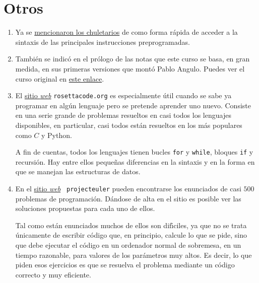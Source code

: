 \section{Otros}
 \begin{enumerate}
  \item Ya se \hyperref[chuletas]{mencionaron los chuletarios} de {\sage} como
forma r\'apida de acceder a la sintaxis de las principales instrucciones
preprogramadas. 
\item Tambi\'en se indic\'o en el pr\'ologo de las notas que este curso se basa,
en gran medida, en sus primeras versiones que mont\'o Pablo Angulo. Puedes ver 
el curso original en 
  \href{http://verso.mat.uam.es/~pablo.angulo/doc/laboratorio/index.html}{este
enlace}. 


  
  
  \item El \href{http://rosettacode.org/wiki/Rosetta_Code}{sitio {\itshape web}}
{\tt rosettacode.org} es especialmente \'util cuando se sabe ya programar en
alg\'un lenguaje pero se pretende aprender uno nuevo. Consiste en una serie
grande de problemas resueltos en casi todos los lenguajes disponibles,  en
particular, casi todos est\'an resueltos en los m\'as populares como $C$ y
Python.

A fin de cuentas, todos los lenguajes tienen bucles \lstinline|for| y
\lstinline|while|, bloques \lstinline|if| y recursi\'on. Hay entre ellos
peque\~nas diferencias en la sintaxis y en la forma en que se manejan las
estructuras de datos. 
  
  \item En el \href{http://projecteuler.net/}{sitio {\itshape web}} {\tt
projecteuler} pueden encontrarse los enunciados de casi $500$ problemas de
programaci\'on. D\'andose de alta en el sitio es posible ver las soluciones
propuestas para cada uno de ellos.  

Tal como est\'an enunciados muchos de ellos son dif\'{\i}ciles, ya que no se
trata \'unicamente de escribir c\'odigo que, en principio, calcule lo que se
pide, sino que debe ejecutar el c\'odigo en un ordenador normal de sobremesa, 
en un tiempo razonable, para valores de los par\'ametros muy altos. Es decir, lo
que piden esos ejercicios es que se resuelva el problema mediante un c\'odigo
correcto y muy eficiente. 

  
  
  
  \end{enumerate}

 
 
 
 
 

 
 
 